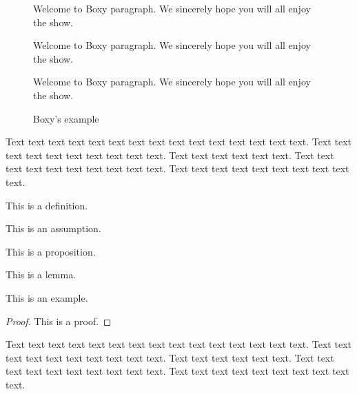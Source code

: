\begin{figure}[!htbp]
\begin{center}
\caption{Boxy's example}\label{box:values}
\begin{boxeditemize}
	\item Welcome to Boxy paragraph. 
We sincerely hope you will
all enjoy the show.
	\item
Welcome to Boxy paragraph.
We sincerely hope you will
all enjoy the show.
	\item 
Welcome to Boxy paragraph.
We sincerely hope you will
all enjoy the show.
\end{boxeditemize}
\end{center}
\begin{source}\cite{Haaparanta1996}\end{source}
\end{figure}

Text text text text text text text text text text text text text text text. Text text text text text text text text text text. Text text text text text text. Text text text text text text text text text text. Text text text text text text text text text text.


\begin{defin}\label{de:definice1}
This is a definition.
\end{defin}

\begin{ass}\label{as:predpoklad1}
This is an assumption.
\end{ass}

\begin{prop}\label{pr:veta1}
This is a proposition.
\end{prop}

\begin{lemma}\label{le:lemma1}
This is a lemma.
\end{lemma}

\begin{exam}\label{ex:priklad1}
This is an example.
\end{exam}

\begin{proof}
This is a proof.
\end{proof}



Text text text text text text text text text text text text text text text. Text text text text text text text text text text. Text text text text text text. Text text text text text text text text text text. Text text text text text text text text text text.


